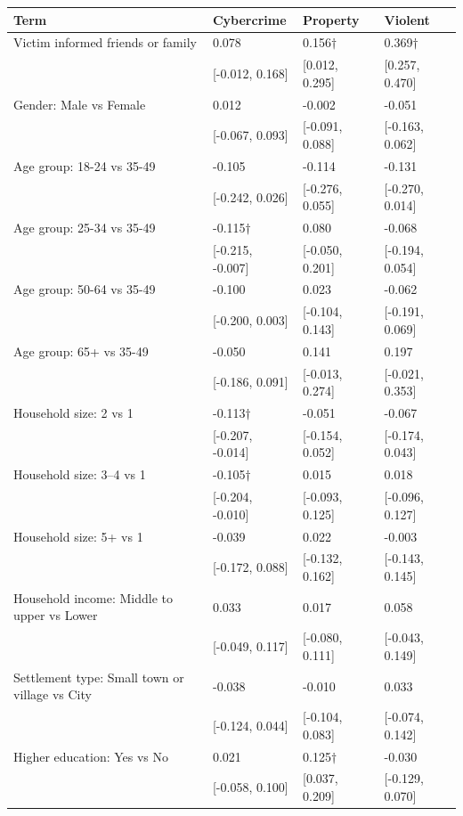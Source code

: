 
\begin{tabular}[t]{llll}
\toprule
Term & Cybercrime & Property & Violent\\
\midrule
Victim informed friends or family & 0.078 & 0.156$\dagger$ & 0.369$\dagger$\\
 & {}[-0.012, 0.168] & {}[0.012, 0.295] & {}[0.257, 0.470]\\
Gender: Male vs Female & 0.012 & -0.002 & -0.051\\
 & {}[-0.067, 0.093] & {}[-0.091, 0.088] & {}[-0.163, 0.062]\\
Age group: 18-24 vs 35-49 & -0.105 & -0.114 & -0.131\\
 & {}[-0.242, 0.026] & {}[-0.276, 0.055] & {}[-0.270, 0.014]\\
Age group: 25-34 vs 35-49 & -0.115$\dagger$ & 0.080 & -0.068\\
 & {}[-0.215, -0.007] & {}[-0.050, 0.201] & {}[-0.194, 0.054]\\
Age group: 50-64 vs 35-49 & -0.100 & 0.023 & -0.062\\
 & {}[-0.200, 0.003] & {}[-0.104, 0.143] & {}[-0.191, 0.069]\\
Age group: 65+ vs 35-49 & -0.050 & 0.141 & 0.197\\
 & {}[-0.186, 0.091] & {}[-0.013, 0.274] & {}[-0.021, 0.353]\\
Household size: 2 vs 1 & -0.113$\dagger$ & -0.051 & -0.067\\
 & {}[-0.207, -0.014] & {}[-0.154, 0.052] & {}[-0.174, 0.043]\\
Household size: 3–4 vs 1 & -0.105$\dagger$ & 0.015 & 0.018\\
 & {}[-0.204, -0.010] & {}[-0.093, 0.125] & {}[-0.096, 0.127]\\
Household size: 5+ vs 1 & -0.039 & 0.022 & -0.003\\
 & {}[-0.172, 0.088] & {}[-0.132, 0.162] & {}[-0.143, 0.145]\\
Household income: Middle to upper vs Lower & 0.033 & 0.017 & 0.058\\
 & {}[-0.049, 0.117] & {}[-0.080, 0.111] & {}[-0.043, 0.149]\\
Settlement type: Small town or village vs City & -0.038 & -0.010 & 0.033\\
 & {}[-0.124, 0.044] & {}[-0.104, 0.083] & {}[-0.074, 0.142]\\
Higher education: Yes vs No & 0.021 & 0.125$\dagger$ & -0.030\\
 & {}[-0.058, 0.100] & {}[0.037, 0.209] & {}[-0.129, 0.070]\\

\end{tabular}
